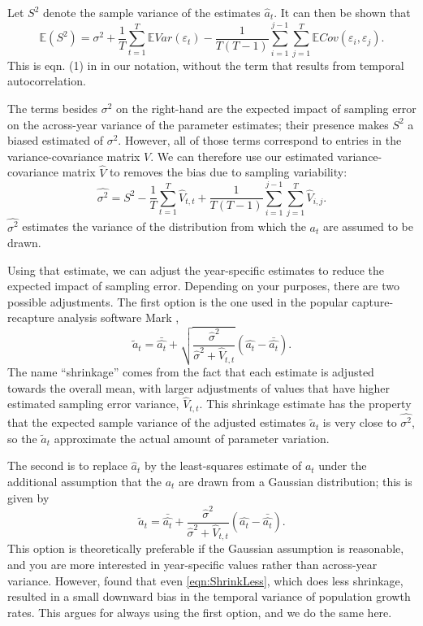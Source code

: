 \documentclass[12pt]{article}
\newcommand{\be}{\begin{equation}}
\newcommand{\ee}{\end{equation}}
\begin{document}
Let $S^2$ denote the sample variance of the estimates $\hat{a}_t$. It can then be shown that 
\be
\mathbb{E}(S^2) = \sigma^2  + \frac{1}{T}\sum\limits_{t=1}^T \mathbb{E} Var(\varepsilon_t) 
- \frac{1}{T(T-1)}\sum\limits_{i=1}^{j-1} \sum\limits_{j=1}^T \mathbb{E}Cov(\varepsilon_i, \varepsilon_j). 
\label{eqn:biasTerms}
\ee
This is eqn. (1) in \citet{gould-nichols-1998} in our notation, without the term that 
results from temporal autocorrelation. 

The terms besides $\sigma^2$ on the right-hand are the expected impact of sampling error on the across-year variance
of the parameter estimates; their presence makes $S^2$ a biased estimated of $\sigma^2$. However,
all of those terms correspond to entries in the variance-covariance matrix $V$. We can therefore use our estimated
variance-covariance matrix $\hat{V}$ to removes the bias due to sampling variability: 
\be
\hat{\sigma^2}  = S^2 - \frac{1}{T}\sum\limits_{t=1}^T \hat{V}_{t,t} + 
\frac{1}{T(T-1)}\sum\limits_{i=1}^{j-1} \sum\limits_{j=1}^T \hat{V}_{i,j}. 
\label{eqn:hatSigma}
\ee
$\hat{\sigma^2}$ estimates the variance of the distribution from which the $a_t$ are assumed
to be drawn. 

Using that estimate, we can adjust the year-specific estimates to reduce the expected 
impact of sampling error. Depending on your purposes, there are two possible adjustments. 
The first option is the one used in the popular capture-recapture analysis 
software Mark \citet{cooch-white-2020}, 
\be
\widetilde{a}_t = \bar{\hat{a_t}} + \sqrt{\frac{\hat{\sigma}^2}{\hat{\sigma}^2 + \hat{V}_{t,t}}}\left (\hat{a_t} - \bar{\hat{a_t}} \right). 
\label{eqn:ShrinkLess}
\ee
The name ``shrinkage'' comes from the fact that each estimate is adjusted towards the overall mean, with 
larger adjustments of values that have higher estimated sampling error variance, $\hat{V}_{t,t}$. 
This shrinkage estimate has the property that the expected sample variance of the 
adjusted estimates $\widetilde{a}_t$ is very close to $\hat{\sigma^2}$, so the $\widetilde{a}_t$ approximate
the actual amount of parameter variation. 

The second is to replace $\hat{a}_t$ by the least-squares estimate of $a_t$ under the 
additional assumption that the $a_t$ are drawn from a Gaussian distribution; this is given by 
\be
\widetilde{a}_t = \bar{\hat{a_t}} + \frac{\hat{\sigma}^2}{\hat{\sigma}^2 + \hat{V}_{t,t}}\left (\hat{a_t} - \bar{\hat{a_t}} \right). 
\label{eqn:ShrinkMore}
\ee
This option is theoretically preferable if the Gaussian assumption is reasonable, and you are more interested in year-specific values rather 
than across-year variance. However, \citet{metcalf-etal-2015} found that even \eqref{eqn:ShrinkLess}, which does 
less shrinkage, resulted in a small downward bias in the temporal variance of population growth rates. This argues for  
always using the first option, and we do the same here. 
\end{document}
